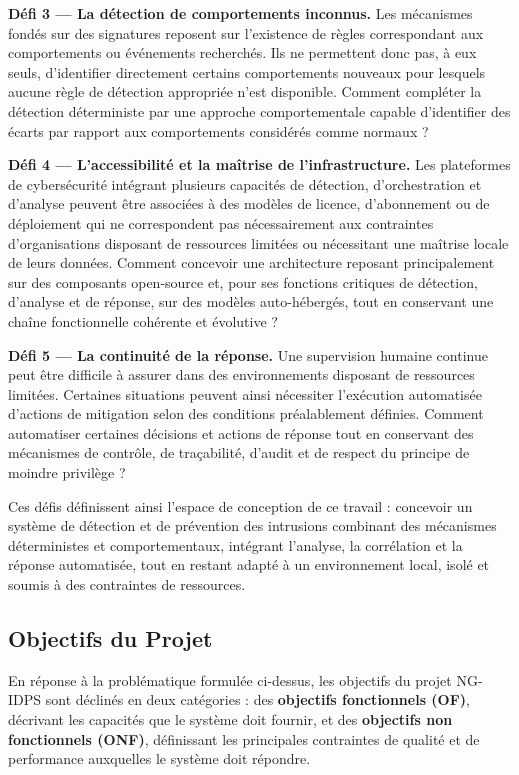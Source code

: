 \textbf{Défi 3 — La détection de comportements inconnus.} Les mécanismes fondés sur des signatures reposent sur l'existence de règles correspondant aux comportements ou événements recherchés. Ils ne permettent donc pas, à eux seuls, d'identifier directement certains comportements nouveaux pour lesquels aucune règle de détection appropriée n'est disponible. Comment compléter la détection déterministe par une approche comportementale capable d'identifier des écarts par rapport aux comportements considérés comme normaux ?

\textbf{Défi 4 — L'accessibilité et la maîtrise de l'infrastructure.} Les plateformes de cybersécurité intégrant plusieurs capacités de détection, d'orchestration et d'analyse peuvent être associées à des modèles de licence, d'abonnement ou de déploiement qui ne correspondent pas nécessairement aux contraintes d'organisations disposant de ressources limitées ou nécessitant une maîtrise locale de leurs données. Comment concevoir une architecture reposant principalement sur des composants open-source et, pour ses fonctions critiques de détection, d'analyse et de réponse, sur des modèles auto-hébergés, tout en conservant une chaîne fonctionnelle cohérente et évolutive ?

\textbf{Défi 5 — La continuité de la réponse.} Une supervision humaine continue peut être difficile à assurer dans des environnements disposant de ressources limitées. Certaines situations peuvent ainsi nécessiter l'exécution automatisée d'actions de mitigation selon des conditions préalablement définies. Comment automatiser certaines décisions et actions de réponse tout en conservant des mécanismes de contrôle, de traçabilité, d'audit et de respect du principe de moindre privilège ?

Ces défis définissent ainsi l'espace de conception de ce travail : concevoir un système de détection et de prévention des intrusions combinant des mécanismes déterministes et comportementaux, intégrant l'analyse, la corrélation et la réponse automatisée, tout en restant adapté à un environnement local, isolé et soumis à des contraintes de ressources.

\subsection{Objectifs du Projet}

En réponse à la problématique formulée ci-dessus, les objectifs du projet NG-IDPS sont déclinés en deux catégories : des \textbf{objectifs fonctionnels (OF)}, décrivant les capacités que le système doit fournir, et des \textbf{objectifs non fonctionnels (ONF)}, définissant les principales contraintes de qualité et de performance auxquelles le système doit répondre.

